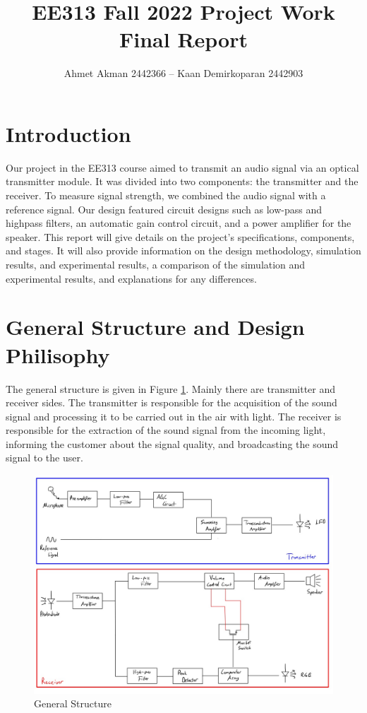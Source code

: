 \documentclass[a4paper,10pt]{IEEEtran}
\title{  EE313 Fall 2022 Project Work  \protect\\ Final Report}
\author{ Ahmet Akman 2442366 -- Kaan Demirkoparan 2442903 }
\date{}
\begin{document}
\thispagestyle{empty}


\maketitle

\section{Introduction}
Our project in the EE313 course aimed to transmit an audio signal via an optical transmitter module. It was divided into two components: the transmitter and the receiver. To measure signal strength, we combined the audio signal with a reference signal. Our design featured circuit designs such as low-pass and highpass filters, an automatic gain control circuit, and a power amplifier for the speaker. This report will give details on the project's specifications, components, and stages. It will also provide information on the design methodology, simulation results, and experimental results, a comparison of the simulation and experimental results, and explanations for any differences.
\section{General Structure and Design Philisophy}
The general structure is given in Figure \ref{general}. Mainly there are transmitter and receiver sides. The transmitter is responsible for the acquisition of the sound signal and processing it to be carried out in the air with light. The receiver is responsible for the extraction of the sound signal from the incoming light, informing the customer about the signal quality, and broadcasting the sound signal to the user.
\begin{figure}[htbp!]
    \centering
    \includegraphics[width = 1\linewidth]{general_structure.jpeg}
    \caption{General Structure}
    \label{general}
\end{figure} 
\end{document}
